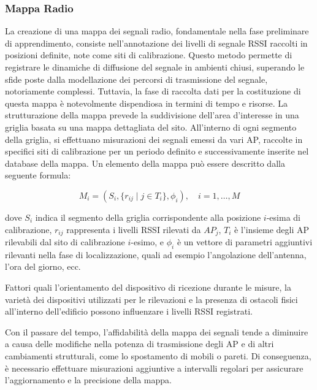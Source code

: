 \subsubsection{Mappa Radio}
\hspace{\parindent}La creazione di una mappa dei segnali radio, fondamentale nella fase preliminare di apprendimento, consiste nell'annotazione dei livelli di segnale RSSI raccolti in posizioni definite, note come siti di calibrazione. Questo metodo permette di registrare le dinamiche di diffusione del segnale in ambienti chiusi, superando le sfide poste dalla modellazione dei percorsi di trasmissione del segnale, notoriamente complessi. Tuttavia, la fase di raccolta dati per la costituzione di questa mappa è notevolmente dispendiosa in termini di tempo e risorse. La strutturazione della mappa prevede la suddivisione dell'area d'interesse in una griglia basata su una mappa dettagliata del sito. All'interno di ogni segmento della griglia, si effettuano misurazioni dei segnali emessi da vari AP, raccolte in specifici siti di calibrazione per un periodo definito e successivamente inserite nel database della mappa. Un elemento della mappa può essere descritto dalla seguente formula:

\begin{equation}
    M_i = \left(S_i, \{r_{ij} \mid j \in T_i\}, \phi_i\right), \quad i = 1, \ldots, M
\end{equation}

\noindent dove $S_i$ indica il segmento della griglia corrispondente alla posizione $i$-esima di calibrazione, $r_{ij}$ rappresenta i livelli RSSI rilevati da $AP_j$, $T_i$ è l'insieme degli AP rilevabili dal sito di calibrazione $i$-esimo, e $\phi_i$ è un vettore di parametri aggiuntivi rilevanti nella fase di localizzazione, quali ad esempio l'angolazione dell'antenna, l'ora del giorno, ecc.

Fattori quali l'orientamento del dispositivo di ricezione durante le misure, la varietà dei dispositivi utilizzati per le rilevazioni e la presenza di ostacoli fisici all'interno dell'edificio possono influenzare i livelli RSSI registrati.

Con il passare del tempo, l'affidabilità della mappa dei segnali tende a diminuire a causa delle modifiche nella potenza di trasmissione degli AP e di altri cambiamenti strutturali, come lo spostamento di mobili o pareti. Di conseguenza, è necessario effettuare misurazioni aggiuntive a intervalli regolari per assicurare l'aggiornamento e la precisione della mappa.

